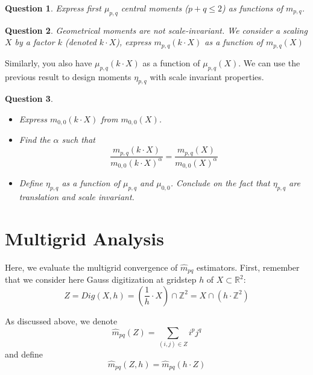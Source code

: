 \documentclass[a4paper, 11pt]{article}
\newtheorem{qu}{Question}
\begin{document}
\begin{qu}
 Express first $\mu_{p,q}$ central moments ($p+q\leq 2$) as functions of $m_{p,q}$.
\end{qu}


\begin{qu}
	Geometrical moments are not scale-invariant. We consider a
        scaling $X$ by a factor $k$ (denoted $k\cdot X$), express
        $m_{p,q}(k\cdot X)$ as a function of $m_{p,q}(X)$
\end{qu}

\noindent Similarly, you also have $\mu_{p,q}(k\cdot X)$ as a function
of $\mu_{p,q}(X)$.  We can use the previous result to design moments
$\eta_{p,q}$ with scale invariant properties.

\begin{qu}
\begin{itemize}
\item Express $m_{0,0}(k\cdot X)$ from $m_{0,0}(X)$.
\item Find the $\alpha$ such that 
\begin{displaymath}
\frac{m_{p,q}(k\cdot X)}{m_{0,0}(k\cdot X)^\alpha} = \frac{m_{p,q}(X)}{m_{0,0}(X)^\alpha}
\end{displaymath}
\item Define $\eta_{p,q}$ as a function of $\mu_{p,q}$ and $\mu_{0,0}$. Conclude on the fact that $\eta_{p,q}$ are translation and scale invariant.
\end{itemize}
\end{qu}


\section{Multigrid Analysis}

Here, we evaluate the multigrid convergence of $\hat{m}_{pq}$
estimators. First, remember that we consider here Gauss digitization
at gridstep $h$ of $X\subset \mathbb{R}^2$:
\begin{displaymath}
  Z = Dig(X,h) = \left(\frac{1}{h}\cdot X\right)\cap \mathbb{Z}^2 = X\cap (h\cdot \mathbb{Z}^2)
\end{displaymath}




As discussed above, we denote
\begin{displaymath}
\hat{m}_{pq}(Z) = \sum_{(i,j)\in Z} i^pj^q
\end{displaymath}
and define 
\begin{displaymath}
\hat{m}_{pq}(Z,h) = \hat{m}_{pq}(h\cdot Z)
\end{displaymath}
\end{document}
